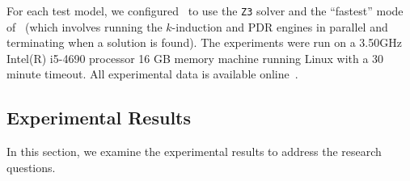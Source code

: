For each test model, we configured \jkind\ to use the \texttt{Z3} solver and the ``fastest'' mode of \jkind\ (which involves running the $k$-induction and PDR engines in parallel and terminating when a solution is found). The experiments were run on a  3.50GHz  Intel(R) i5-4690 processor 16 GB memory machine running Linux with a 30 minute timeout.  All experimental data is available online~\cite{expr}.



\subsection{Experimental Results}
In this section, we examine the experimental results to address the research questions.

